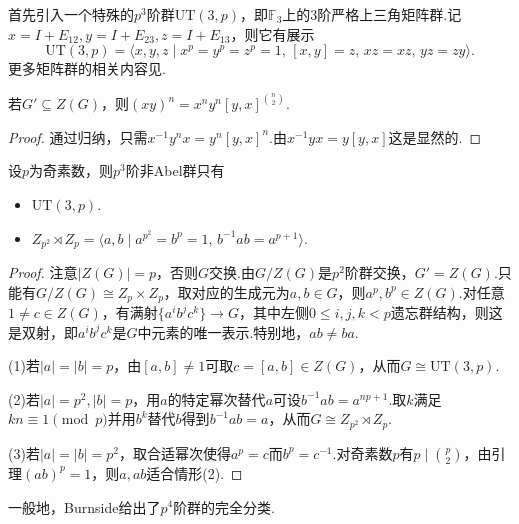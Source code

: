首先引入一个特殊的$p^3$阶群$\mathrm{UT}(3,p)$，即$\mathbb{F}_3$上的$3$阶严格上三角矩阵群.记$x=I+E_{12},y=I+E_{23},z=I+E_{13}$，则它有展示
\[
	\mathrm{UT}(3,p)=\langle x,y,z\mid x^p=y^p=z^p=1,\,[x,y]=z,\,xz=xz,\,yz=zy\rangle .
\]
更多矩阵群的相关内容见.%
\begin{lemma*}
	若$G'\subseteq Z(G)$，则$(xy)^n=x^ny^n[y,x]^{\binom{n}{2}}$.
\end{lemma*}
\begin{proof}
	通过归纳，只需$x^{-1}y^nx=y^n[y,x]^n$.由$x^{-1}yx=y[y,x]$这是显然的.
\end{proof}
\begin{prop}
	设$p$为奇素数，则$p^3$阶非Abel群只有
	\begin{itemize}
		\item $\mathrm{UT}(3,p)$.
		\item $Z_{p^2}\rtimes Z_p=\langle a,b\mid a^{p^2}=b^p=1,\,b^{-1}ab=a^{p+1}\rangle $.
	\end{itemize}
\end{prop}
\begin{proof}
	注意$|Z(G)|=p$，否则$G$交换.由$G/Z(G)$是$p^2$阶群交换，$G'=Z(G)$.只能有$G/Z(G)\cong Z_p\times Z_p$，取对应的生成元为$a,b\in G$，则$a^p,b^p\in Z(G)$.对任意$1\ne c\in Z(G)$，有满射$\{a^ib^jc^k\}\to G$，其中左侧$0\le i,j,k<p$遗忘群结构，则这是双射，即$a^ib^jc^k$是$G$中元素的唯一表示.特别地，$ab\ne ba$.

	(1)若$|a|=|b|=p$，由$[a,b]\ne 1$可取$c=[a,b]\in Z(G)$，从而$G\cong\mathrm{UT}(3,p)$.

	(2)若$|a|=p^2,|b|=p$，用$a$的特定幂次替代$a$可设$b^{-1}ab=a^{np+1}$.取$k$满足$kn\equiv 1\pmod p$并用$b^k$替代$b$得到$b^{-1}ab=a$，从而$G\cong Z_{p^2}\rtimes Z_p$.

	(3)若$|a|=|b|=p^2$，取合适幂次使得$a^p=c$而$b^p=c^{-1}$.对奇素数$p$有$p\mid\binom{p}{2}$，由引理$(ab)^p=1$，则$a,ab$适合情形(2).
\end{proof}
\begin{remark}
	一般地，Burnside给出了$p^4$阶群的完全分类.
\end{remark}

